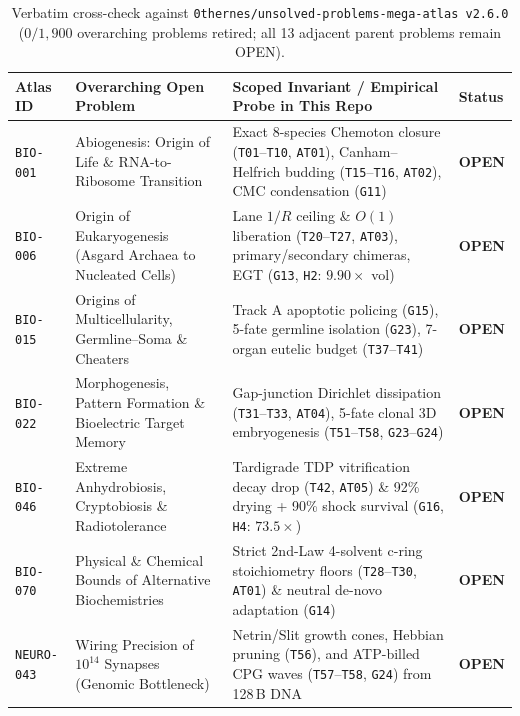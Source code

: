 \documentclass[11pt,reqno]{amsart}
\theoremstyle{plain}
\theoremstyle{definition}
\theoremstyle{remark}
\newcommand{\code}[1]{{\footnotesize\nolinkurl{#1}}}
\newcommand{\tcode}[1]{{\scriptsize\nolinkurl{#1}}}
\begin{document}
\begin{table}[ht]
\centering
\caption{Verbatim cross-check against \code{0thernes/unsolved-problems-mega-atlas v2.6.0} ($0 / 1{,}900$ overarching problems retired; all 13 adjacent parent problems remain OPEN).}
\label{tab:megaatlas}
\scriptsize
\renewcommand{\arraystretch}{1.12}
\begin{tabularx}{\textwidth}{@{} P{1.65cm} P{3.95cm} Y P{1.15cm} @{}}
\toprule
\textbf{Atlas ID} & \textbf{Overarching Open Problem} & \textbf{Scoped Invariant / Empirical Probe in This Repo} & \textbf{Status} \\
\midrule
\tcode{BIO-001} & Abiogenesis: Origin of Life \& RNA-to-Ribosome Transition & Exact 8-species Chemoton closure (\tcode{T01}--\tcode{T10}, \tcode{AT01}), Canham--Helfrich budding (\tcode{T15}--\tcode{T16}, \tcode{AT02}), CMC condensation (\tcode{G11}) & \textbf{OPEN} \\
\tcode{BIO-006} & Origin of Eukaryogenesis (Asgard Archaea to Nucleated Cells) & Lane $1/R$ ceiling \& $O(1)$ liberation (\tcode{T20}--\tcode{T27}, \tcode{AT03}), primary/secondary chimeras, EGT (\tcode{G13}, \tcode{H2}: $9.90\times$ vol) & \textbf{OPEN} \\
\tcode{BIO-015} & Origins of Multicellularity, Germline--Soma \& Cheaters & Track A apoptotic policing (\tcode{G15}), 5-fate germline isolation (\tcode{G23}), 7-organ eutelic budget (\tcode{T37}--\tcode{T41}) & \textbf{OPEN} \\
\tcode{BIO-022} & Morphogenesis, Pattern Formation \& Bioelectric Target Memory & Gap-junction Dirichlet dissipation (\tcode{T31}--\tcode{T33}, \tcode{AT04}), 5-fate clonal 3D embryogenesis (\tcode{T51}--\tcode{T58}, \tcode{G23}--\tcode{G24}) & \textbf{OPEN} \\
\tcode{BIO-046} & Extreme Anhydrobiosis, Cryptobiosis \& Radiotolerance & Tardigrade TDP vitrification decay drop (\tcode{T42}, \tcode{AT05}) \& 92\% drying + 90\% shock survival (\tcode{G16}, \tcode{H4}: $73.5\times$) & \textbf{OPEN} \\
\tcode{BIO-070} & Physical \& Chemical Bounds of Alternative Biochemistries & Strict 2nd-Law 4-solvent c-ring stoichiometry floors (\tcode{T28}--\tcode{T30}, \tcode{AT01}) \& neutral de-novo adaptation (\tcode{G14}) & \textbf{OPEN} \\
\tcode{NEURO-043} & Wiring Precision of $10^{14}$ Synapses (Genomic Bottleneck) & Netrin/Slit growth cones, Hebbian pruning (\tcode{T56}), and ATP-billed CPG waves (\tcode{T57}--\tcode{T58}, \tcode{G24}) from 128\,B DNA & \textbf{OPEN} \\

\end{tabularx}
\end{table}
\end{document}
